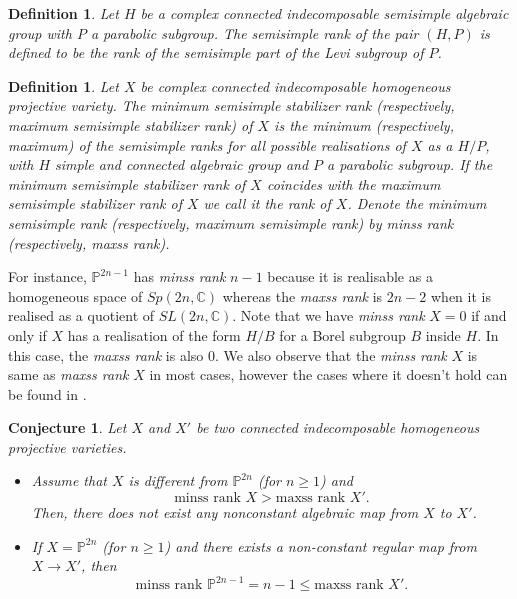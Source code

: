 \documentclass[a4paper,11pt]{amsart}
\newtheorem{definition}[theorem]{Definition}
\newtheorem{conjecture}[theorem]{Conjecture}
\begin{document}
\begin{definition} Let $H$ be a complex connected indecomposable semisimple algebraic group with $P$ a parabolic subgroup. The {\em semisimple rank} of the pair $(H,P)$ is defined to be the rank of the semisimple part of the Levi subgroup of $P$. 
\end{definition}

\begin{definition} Let $X$ be complex connected indecomposable homogeneous projective variety. The {\em minimum semisimple stabilizer rank} (respectively, {\em maximum semisimple stabilizer rank}) of $X$ is the minimum (respectively, maximum) of the semisimple ranks for all possible realisations of $X$ as a $H/P$, with $H$ simple and connected algebraic group and $P$ a parabolic subgroup. If the minimum semisimple stabilizer rank of $X$ coincides with the maximum semisimple stabilizer rank of $X$ we call it the rank of $X$. Denote the minimum semisimple rank (respectively, maximum semisimple rank) by  {\em minss rank} (respectively, {\em maxss rank}).
\end{definition}

For instance, $\mathbb{P}^{2n-1}$ has {\em minss rank} $n-1$ because it is realisable as a homogeneous space of $Sp(2n,\mathbb{C})$ whereas the {\em maxss rank} is $2n-2$ when it is realised as a quotient of $SL(2n,\mathbb{C})$. Note that we have {\em minss rank} $X = 0$ if and only if $X$ has a realisation of the form $H/B$ for a Borel subgroup $B$ inside $H$. In this case, the {\em maxss rank} is also $0$. We also observe that  the {\em minss rank} $X$ is same as {\em maxss rank} $X$ in most cases, however the cases where it doesn't hold can be found in \cite[\S 2]{Demazureauto}.

\begin{conjecture}\cite[Conjecture 5]{kumarsconj} Let $X$ and $X'$ be two connected indecomposable homogeneous projective varieties.
\begin{itemize}
\item[(a)] Assume that $X$ is different from $\mathbb{P}^{2n}$ (for $n \geq 1$) and \[ \text{minss rank } X > \text{maxss rank } X'. 
\]
Then, there does not exist any nonconstant algebraic map from $X$ to $X'$.  
\item[(b)] If $X = \mathbb{P}^{2n}$ (for $n \geq 1$) and there exists a non-constant regular map from $X \to X'$, then
\[ \text{minss rank } \mathbb{P}^{2n-1} = n-1  \leq  \text{maxss rank } X'.
\] 
\end{itemize}
\end{conjecture}
\end{document}
